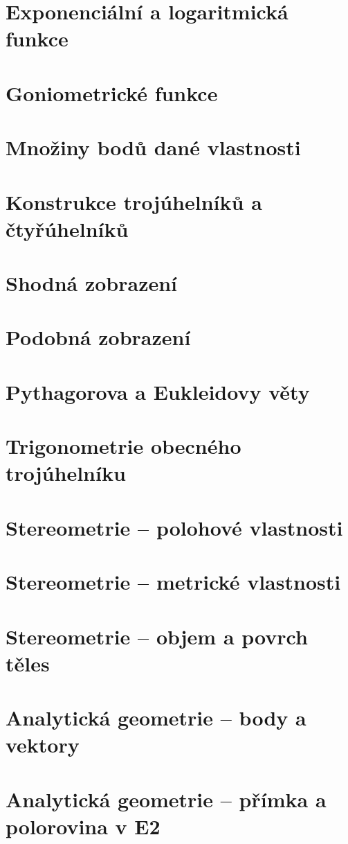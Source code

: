 \documentclass[12pt, a4paper]{article}
\begin{document}
\section{Exponenciální a logaritmická funkce}
\section{Goniometrické funkce}
\section{Množiny bodů dané vlastnosti}
\section{Konstrukce trojúhelníků a čtyřúhelníků}
\section{Shodná zobrazení}
\section{Podobná zobrazení}
\section{Pythagorova a Eukleidovy věty}
\section{Trigonometrie obecného trojúhelníku}
\section{Stereometrie – polohové vlastnosti}
\section{Stereometrie – metrické vlastnosti}
\section{Stereometrie – objem a povrch těles}
\section{Analytická geometrie – body a vektory}
\section{Analytická geometrie – přímka a polorovina v E2}
\end{document}
